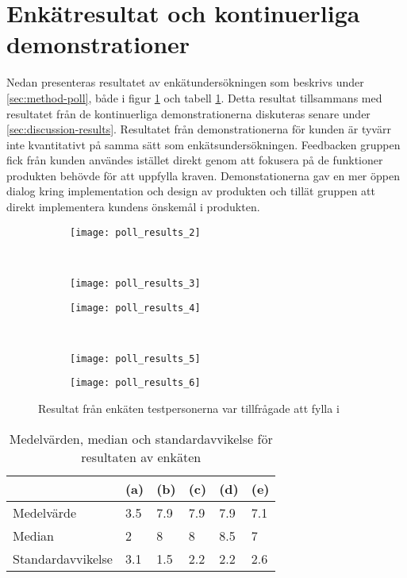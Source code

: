\pagebreak

\section{Enkätresultat och kontinuerliga demonstrationer}

Nedan presenteras resultatet av enkätundersökningen som beskrivs under \ref{sec:method-poll}, både i figur \ref{fig:poll_results} och tabell \ref{tab:poll_results_table}. Detta resultat tillsammans med resultatet från de kontinuerliga demonstrationerna diskuteras senare under \ref{sec:discussion-results}. Resultatet från demonstrationerna för kunden är tyvärr inte kvantitativt på samma sätt som enkätsundersökningen. Feedbacken gruppen fick från kunden användes istället direkt genom att fokusera på de funktioner produkten behövde för att uppfylla kraven. Demonstationerna gav en mer öppen dialog kring implementation och design av produkten och tillät gruppen att direkt implementera kundens önskemål i produkten.

\begin{figure}[h]
    \centering
    \begin{subfigure}[]{0.5\textwidth}
        \centering
        \texttt{[image: poll\_results\_2]}
        \caption{}
    \end{subfigure}%
    ~
    \begin{subfigure}[]{0.5\textwidth}
        \centering
        \texttt{[image: poll\_results\_3]}
        \caption{}
    \end{subfigure}

    \begin{subfigure}[]{0.5\textwidth}
        \centering
        \texttt{[image: poll\_results\_4]}
        \caption{}
    \end{subfigure}%
    ~
    \begin{subfigure}[]{0.5\textwidth}
        \centering
        \texttt{[image: poll\_results\_5]}
        \caption{}
    \end{subfigure}

    \begin{subfigure}[]{0.5\textwidth}
        \centering
        \texttt{[image: poll\_results\_6]}
        \caption{}
    \end{subfigure}%
    \caption{Resultat från enkäten testpersonerna var tillfrågade att fylla i}
    \label{fig:poll_results}
\end{figure}

\begin{table}[h]
    \centering
    \begin{tabular}{| l | l | l | l | l | l |}
        \cline{2-6}
        \multicolumn{1}{c|}{} & (a) & (b) & (c) & (d) & (e) \\ \hline
        Medelvärde & 3.5 & 7.9 & 7.9 & 7.9 & 7.1  \\ \hline
        Median & 2 & 8 & 8 & 8.5 & 7  \\ \hline
        Standardavvikelse & 3.1 & 1.5 & 2.2 & 2.2 & 2.6  \\ \hline
    \end{tabular}
    \caption{Medelvärden, median och standardavvikelse för resultaten av enkäten}
    \label{tab:poll_results_table}
\end{table}
